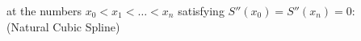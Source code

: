 \begin{enumerate}
 at the numbers $x_0<x_1<\ldots<x_n$ satisfying $S''(x_0) = S''(x_n) = 0:$\\
  (Natural Cubic Spline)
\end{enumerate}
